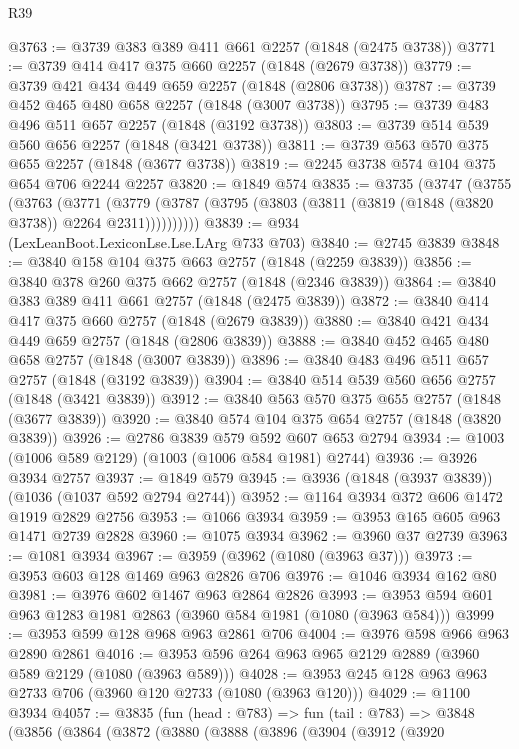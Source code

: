 \begin{lexlean}{R39}
\begin{coremodule}
@3763 := @3739 @383 @389 @411 @661 @2257 (@1848 (@2475 @3738))
@3771 := @3739 @414 @417 @375 @660 @2257 (@1848 (@2679 @3738))
@3779 := @3739 @421 @434 @449 @659 @2257 (@1848 (@2806 @3738))
@3787 := @3739 @452 @465 @480 @658 @2257 (@1848 (@3007 @3738))
@3795 := @3739 @483 @496 @511 @657 @2257 (@1848 (@3192 @3738))
@3803 := @3739 @514 @539 @560 @656 @2257 (@1848 (@3421 @3738))
@3811 := @3739 @563 @570 @375 @655 @2257 (@1848 (@3677 @3738))
@3819 := @2245 @3738 @574 @104 @375 @654 @706 @2244 @2257
@3820 := @1849 @574
@3835 := @3735
    (@3747
      (@3755
        (@3763
          (@3771
            (@3779 (@3787 (@3795 (@3803 (@3811 (@3819 (@1848 (@3820 @3738)) @2264 @2311))))))))))
@3839 := @934 (LexLeanBoot.LexiconLse.Lse.LArg @733 @703)
@3840 := @2745 @3839
@3848 := @3840 @158 @104 @375 @663 @2757 (@1848 (@2259 @3839))
@3856 := @3840 @378 @260 @375 @662 @2757 (@1848 (@2346 @3839))
@3864 := @3840 @383 @389 @411 @661 @2757 (@1848 (@2475 @3839))
@3872 := @3840 @414 @417 @375 @660 @2757 (@1848 (@2679 @3839))
@3880 := @3840 @421 @434 @449 @659 @2757 (@1848 (@2806 @3839))
@3888 := @3840 @452 @465 @480 @658 @2757 (@1848 (@3007 @3839))
@3896 := @3840 @483 @496 @511 @657 @2757 (@1848 (@3192 @3839))
@3904 := @3840 @514 @539 @560 @656 @2757 (@1848 (@3421 @3839))
@3912 := @3840 @563 @570 @375 @655 @2757 (@1848 (@3677 @3839))
@3920 := @3840 @574 @104 @375 @654 @2757 (@1848 (@3820 @3839))
@3926 := @2786 @3839 @579 @592 @607 @653 @2794
@3934 := @1003 (@1006 @589 @2129) (@1003 (@1006 @584 @1981) @2744)
@3936 := @3926 @3934 @2757
@3937 := @1849 @579
@3945 := @3936 (@1848 (@3937 @3839)) (@1036 (@1037 @592 @2794 @2744))
@3952 := @1164 @3934 @372 @606 @1472 @1919 @2829 @2756
@3953 := @1066 @3934
@3959 := @3953 @165 @605 @963 @1471 @2739 @2828
@3960 := @1075 @3934
@3962 := @3960 @37 @2739
@3963 := @1081 @3934
@3967 := @3959 (@3962 (@1080 (@3963 @37)))
@3973 := @3953 @603 @128 @1469 @963 @2826 @706
@3976 := @1046 @3934 @162 @80
@3981 := @3976 @602 @1467 @963 @2864 @2826
@3993 := @3953 @594 @601 @963 @1283 @1981 @2863 (@3960 @584 @1981 (@1080 (@3963 @584)))
@3999 := @3953 @599 @128 @968 @963 @2861 @706
@4004 := @3976 @598 @966 @963 @2890 @2861
@4016 := @3953 @596 @264 @963 @965 @2129 @2889 (@3960 @589 @2129 (@1080 (@3963 @589)))
@4028 := @3953 @245 @128 @963 @963 @2733 @706 (@3960 @120 @2733 (@1080 (@3963 @120)))
@4029 := @1100 @3934
@4057 := @3835
    (fun (head : @783) =>
    fun (tail : @783) =>
    @3848
      (@3856
        (@3864
          (@3872
            (@3880
              (@3888
                (@3896
                  (@3904
                    (@3912
                      (@3920

\end{coremodule}
\end{lexlean}
